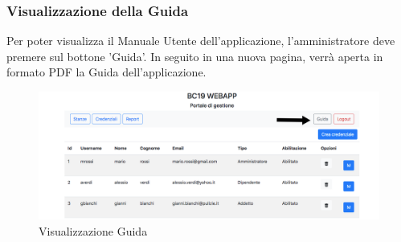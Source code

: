 \subsubsection{Visualizzazione della Guida}
Per poter visualizza il Manuale Utente dell'applicazione, l'amministratore deve premere sul bottone 'Guida'. In seguito in una nuova pagina, verrà aperta in formato PDF la Guida dell'applicazione.
\begin{figure}[H]
	\centering
	\includegraphics[width=15cm]{res/images/guida.jpg}
	\caption{Visualizzazione Guida}
\end{figure}
